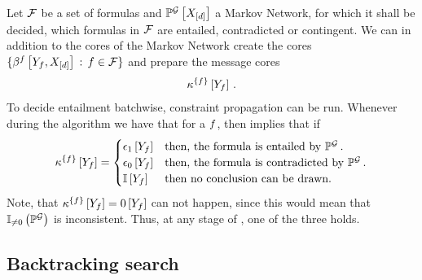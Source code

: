 \begin{example}
    Let $\mathcal{F}$ be a set of formulas and $\mathbb{P}^{\mathcal{G}}\left[X_{[d]}\right]$ a Markov Network, for which it shall be decided, which formulas in $\mathcal{F}$ are entailed, contradicted or contingent.
    We can in addition to the cores of the Markov Network create the cores $\{\bencodingofat{\exformula}{\formulavar,\shortcatvariables} \wcols \exformula\in\formulaset\}$ and prepare the message cores
    \begin{align*}
        \kappa^{\{f\}}\left[Y_{f}\right] \, .
    \end{align*}
    To decide entailment batchwise, constraint propagation  can be run.
    Whenever during the algorithm we have that for a $f$, then  implies that if
    \begin{align*}
        \kappa^{\{f\}}\left[Y_{f}\right] =
        \begin{cases}
            \epsilon_{1}\left[Y_{f}\right] & \text{then, the formula is entailed by }\mathbb{P}^{\mathcal{G}} \, . \\
            \epsilon_{0}\left[Y_{f}\right] & \text{then, the formula is contradicted by }\mathbb{P}^{\mathcal{G}} \, .\\
            \mathbb{I}\left[Y_{f}\right] & \text{then no conclusion can be drawn.}
        \end{cases}
    \end{align*}
    Note, that $\kappa^{\{f\}}\left[Y_{f}\right] = 0\left[Y_{f}\right]$ can not happen, since this would mean that $\mathbb{I}_{\neq0}\left(\mathbb{P}^{\mathcal{G}}\right)$ is inconsistent.
    Thus, at any stage of , one of the three holds.
\end{example}

\subsection{Backtracking search}



